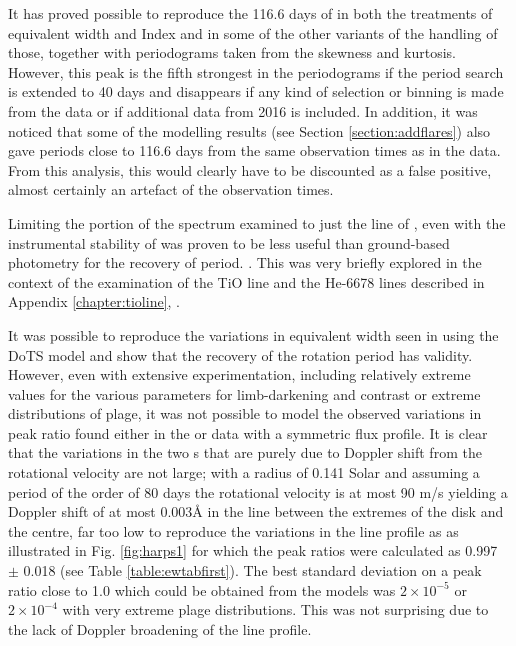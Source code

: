 It has proved possible to reproduce the 116.6 days of \citet[Table 3]{suarezmascareno15} in both the treatments of
equivalent width and {\ha} Index and in some of the other variants of the handling of those, together with periodograms
taken from the skewness and kurtosis. However, this peak is the fifth strongest in the periodograms if the period search
is extended to 40 days and disappears if any kind of selection or binning is made from the data or if additional data
from 2016 is included. In addition, it was noticed that some of the modelling results (see Section
\ref{section:addflares}) also gave periods close to 116.6 days from the same observation times as in the {\harps}
data. From this analysis, this would clearly have to be discounted as a false positive, almost certainly an artefact of
the observation times.

Limiting the portion of the spectrum examined to just the {\ha} line of \prox, even with the instrumental stability of
{\harps} was proven to be less useful than {\asas} ground-based photometry for the recovery of period. . This was very briefly explored in the context of the examination of the TiO line and the He-6678 lines
described in Appendix \ref{chapter:tioline}, .

It was possible to reproduce the variations in equivalent width seen in {\prox} using the DoTS model and show that the
recovery of the rotation period has validity. However, even with extensive experimentation, including relatively extreme
values for the various parameters for limb-darkening and contrast or extreme distributions of plage, it was not possible
to model the observed variations in peak ratio found either in the {\uves} or {\harps} data with a symmetric flux
profile. It is clear that the variations in the two \horn s that are purely due to Doppler shift from the rotational
velocity are not large; with a radius of 0.141 Solar \citep{demory09} and assuming a period of the order of 80 days the
rotational velocity is at most 90 m/s yielding a Doppler shift of at most 0.003{\AA} in the {\ha} line between the
extremes of the disk and the centre, far too low to reproduce the variations in the {\ha} line profile as as illustrated
in Fig. \ref{fig:harps1} for which the peak ratios were calculated as 0.997 $ \pm $ 0.018 (see Table
\ref{table:ewtabfirst}). The best standard deviation on a peak ratio close to 1.0 which could be obtained from the
models was $2{\times}10^{-5}$ or $2{\times}10^{-4}$ with very extreme plage distributions. This was not surprising due
to the lack of Doppler broadening of the line profile.

